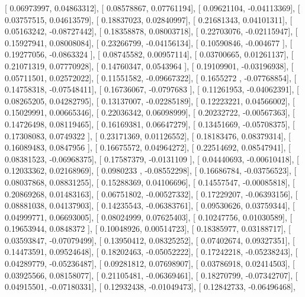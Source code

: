 \documentclass{article}
\begin{document}
       [ 0.06973997,  0.04863312],
       [ 0.08578867,  0.07761194],
       [ 0.09621104, -0.04113369],
       [ 0.03757515,  0.04613579],
       [ 0.18837023,  0.02840997],
       [ 0.21681343,  0.04101311],
       [ 0.05163242, -0.08727442],
       [ 0.18358878,  0.08003718],
       [ 0.22703076, -0.02115947],
       [ 0.15927941,  0.08008084],
       [ 0.23266799, -0.04156134],
       [ 0.10590846, -0.004677  ],
       [ 0.19277056, -0.0863324 ],
       [ 0.08745582,  0.00957114],
       [ 0.03700665,  0.01261137],
       [ 0.21071319,  0.07770928],
       [ 0.14760347,  0.0543964 ],
       [ 0.19109901, -0.03196938],
       [ 0.05711501,  0.02572022],
       [ 0.11551582, -0.09667322],
       [ 0.1655272 , -0.07768854],
       [ 0.14758318, -0.07548411],
       [ 0.16736067, -0.0797683 ],
       [ 0.11261953, -0.04062391],
       [ 0.08265205,  0.04282795],
       [ 0.13137007, -0.02285189],
       [ 0.12223221,  0.04566002],
       [ 0.15029991,  0.00665346],
       [ 0.22036342,  0.06098999],
       [ 0.20232722, -0.00567363],
       [ 0.14726498,  0.08119465],
       [ 0.16169381,  0.06647279],
       [ 0.13451669, -0.05708375],
       [ 0.17308083,  0.0749322 ],
       [ 0.23171369,  0.01126552],
       [ 0.18183476,  0.08379314],
       [ 0.16089483,  0.0847956 ],
       [ 0.16675572,  0.04964272],
       [ 0.22514692,  0.08547941],
       [ 0.08381523, -0.06968375],
       [ 0.17587379, -0.0131109 ],
       [ 0.04440693, -0.00610418],
       [ 0.12033362,  0.02168969],
       [ 0.0980233 , -0.08552298],
       [ 0.16686784, -0.03756523],
       [ 0.08037868,  0.08831255],
       [ 0.15288369,  0.04106696],
       [ 0.14557547, -0.00085818],
       [ 0.20869268,  0.01483163],
       [ 0.06751802, -0.00527332],
       [ 0.17229207, -0.06393156],
       [ 0.08881038,  0.04137903],
       [ 0.14235543, -0.06383761],
       [ 0.09530626,  0.03759344],
       [ 0.04999771,  0.06693005],
       [ 0.08024999,  0.07625403],
       [ 0.10247756,  0.01030589],
       [ 0.19653944,  0.0848372 ],
       [ 0.10048926,  0.00514723],
       [ 0.18385977,  0.03188717],
       [ 0.03593847, -0.07079499],
       [ 0.13950412,  0.08325252],
       [ 0.07402674,  0.09327351],
       [ 0.14473591,  0.09524648],
       [ 0.18202463, -0.05052222],
       [ 0.17242218, -0.05238243],
       [ 0.04289779, -0.05236487],
       [ 0.09281812,  0.07698907],
       [ 0.03786918,  0.02414503],
       [ 0.03925566,  0.08158077],
       [ 0.21105481, -0.06369461],
       [ 0.18270799, -0.07342707],
       [ 0.04915501, -0.07180331],
       [ 0.12932438, -0.01049473],
       [ 0.12842733, -0.06496468],
\end{document}
